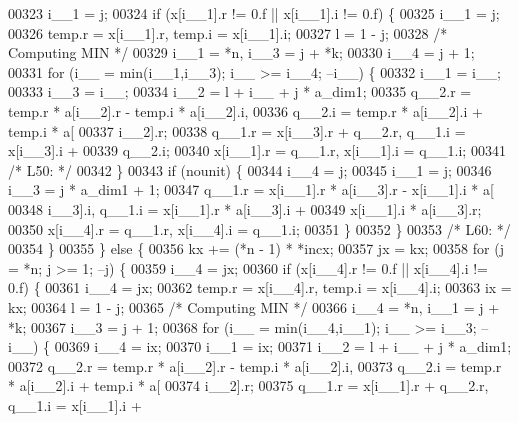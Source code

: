 \begin{DoxyCode}
00323             i\_\_1 = j;
00324             \textcolor{keywordflow}{if} (x[i\_\_1].r != 0.f || x[i\_\_1].i != 0.f) \{
00325             i\_\_1 = j;
00326             temp.r = x[i\_\_1].r, temp.i = x[i\_\_1].i;
00327             l = 1 - j;
00328 \textcolor{comment}{/* Computing MIN */}
00329             i\_\_1 = *n, i\_\_3 = j + *k;
00330             i\_\_4 = j + 1;
00331             \textcolor{keywordflow}{for} (i\_\_ = min(i\_\_1,i\_\_3); i\_\_ >= i\_\_4; --i\_\_) \{
00332                 i\_\_1 = i\_\_;
00333                 i\_\_3 = i\_\_;
00334                 i\_\_2 = l + i\_\_ + j * a\_dim1;
00335                 q\_\_2.r = temp.r * a[i\_\_2].r - temp.i * a[i\_\_2].i, 
00336                     q\_\_2.i = temp.r * a[i\_\_2].i + temp.i * a[
00337                     i\_\_2].r;
00338                 q\_\_1.r = x[i\_\_3].r + q\_\_2.r, q\_\_1.i = x[i\_\_3].i + 
00339                     q\_\_2.i;
00340                 x[i\_\_1].r = q\_\_1.r, x[i\_\_1].i = q\_\_1.i;
00341 \textcolor{comment}{/* L50: */}
00342             \}
00343             \textcolor{keywordflow}{if} (nounit) \{
00344                 i\_\_4 = j;
00345                 i\_\_1 = j;
00346                 i\_\_3 = j * a\_dim1 + 1;
00347                 q\_\_1.r = x[i\_\_1].r * a[i\_\_3].r - x[i\_\_1].i * a[
00348                     i\_\_3].i, q\_\_1.i = x[i\_\_1].r * a[i\_\_3].i + 
00349                     x[i\_\_1].i * a[i\_\_3].r;
00350                 x[i\_\_4].r = q\_\_1.r, x[i\_\_4].i = q\_\_1.i;
00351             \}
00352             \}
00353 \textcolor{comment}{/* L60: */}
00354         \}
00355         \} \textcolor{keywordflow}{else} \{
00356         kx += (*n - 1) * *incx;
00357         jx = kx;
00358         \textcolor{keywordflow}{for} (j = *n; j >= 1; --j) \{
00359             i\_\_4 = jx;
00360             \textcolor{keywordflow}{if} (x[i\_\_4].r != 0.f || x[i\_\_4].i != 0.f) \{
00361             i\_\_4 = jx;
00362             temp.r = x[i\_\_4].r, temp.i = x[i\_\_4].i;
00363             ix = kx;
00364             l = 1 - j;
00365 \textcolor{comment}{/* Computing MIN */}
00366             i\_\_4 = *n, i\_\_1 = j + *k;
00367             i\_\_3 = j + 1;
00368             \textcolor{keywordflow}{for} (i\_\_ = min(i\_\_4,i\_\_1); i\_\_ >= i\_\_3; --i\_\_) \{
00369                 i\_\_4 = ix;
00370                 i\_\_1 = ix;
00371                 i\_\_2 = l + i\_\_ + j * a\_dim1;
00372                 q\_\_2.r = temp.r * a[i\_\_2].r - temp.i * a[i\_\_2].i, 
00373                     q\_\_2.i = temp.r * a[i\_\_2].i + temp.i * a[
00374                     i\_\_2].r;
00375                 q\_\_1.r = x[i\_\_1].r + q\_\_2.r, q\_\_1.i = x[i\_\_1].i + 

\end{DoxyCode}

